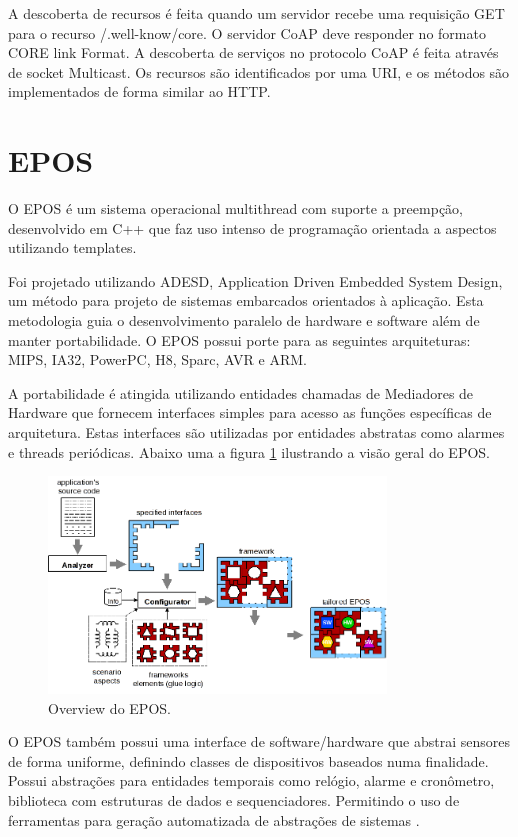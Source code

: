 A descoberta de recursos \'e feita quando um servidor recebe uma requisi\c{c}\~ao GET para o recurso /.well-know/core. O servidor CoAP deve responder no formato CORE link Format\cite{rfc6690}. A descoberta de servi\c{c}os no protocolo CoAP \'e feita atrav\'es de socket Multicast. Os recursos s\~ao identificados por uma URI, e os m\'etodos s\~ao implementados de forma similar ao HTTP.  
\section{EPOS}
O EPOS \'e um sistema operacional multithread com suporte a preemp\c{c}\~ao, desenvolvido em C++ que faz uso intenso de programa\c{c}\~ao orientada a aspectos utilizando templates.

Foi projetado utilizando ADESD, Application Driven Embedded System Design, um m\'etodo para projeto de sistemas embarcados orientados \`a aplica\c{c}\~ao. Esta metodologia guia o desenvolvimento paralelo de hardware e software al\'em de manter portabilidade. O EPOS possui porte para as seguintes arquiteturas: MIPS, IA32, PowerPC, H8, Sparc, AVR e ARM. \cite{eposProject}

A portabilidade \'e atingida utilizando entidades chamadas de Mediadores de Hardware que fornecem interfaces simples para acesso as fun\c{c}\~oes espec\'ificas de arquitetura. Estas interfaces s\~ao utilizadas por entidades abstratas como alarmes e threads peri\'odicas. Abaixo uma a figura \ref{eposOverview} ilustrando a vis\~ao geral do EPOS.

\begin{figure}[H]
   \centering
   \includegraphics[width=0.8\textwidth]{figuras/eposOverview.png}
   \caption{Overview do EPOS.}
   \label{eposOverview}
\end{figure}

 
O EPOS tamb\'em possui uma interface de software/hardware que abstrai sensores de forma uniforme, definindo classes de dispositivos baseados numa finalidade. Possui abstra\c{c}\~oes para entidades temporais como rel\'ogio, alarme e cron\^ometro, biblioteca com estruturas de dados e sequenciadores. Permitindo o uso de ferramentas para gera\c{c}\~ao automatizada de abstra\c{c}\~oes de sistemas \cite{epos}.

